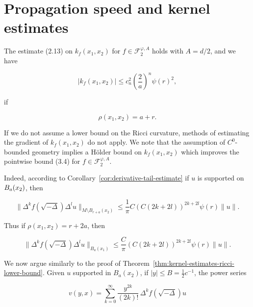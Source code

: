 \chapter{Propagation speed and kernel estimates}

The estimate (2.13) on $k_f(x_1,x_2)$ for $f\in \mathscr{F}_2^{\varphi,A}$ holds with $A=d/2$, and we have

\begin{equation}\tag{3.4}
|k_f(x_1,x_2)|\le c_n^2\left(\frac{2}{a}\right)^n \psi(r)^2,
\end{equation}

if

\begin{equation}\tag{3.5}
\rho(x_1,x_2)=a+r.
\end{equation}

If we do not assume a lower bound on the Ricci curvature, methods of estimating the gradient of $k_f(x_1,x_2)$ do not apply. We note that the assumption of $C^0$-bounded geometry implies a H\"older bound on $k_f(x_1,x_2)$ which improves the pointwise bound (3.4) for $f\in \mathscr{F}_2^{\varphi,A}$.

Indeed, according to Corollary~\ref{cor:derivative-tail-estimate} if $u$ is supported on $B_a(x_2)$, then

\begin{equation}\tag{3.6}
\bigl\|\Delta^k f(\sqrt{-\Delta}) \Delta^l u\bigr\|_{M\setminus B_{r+a}(x_2)}
\le \frac{1}{\pi} C(C(2k+2l))^{2k+2l}\psi(r)\|u\|.
\end{equation}

Thus if $\rho(x_1,x_2)=r+2a$, then

\begin{equation}\tag{3.7}
\bigl\|\Delta^k f(\sqrt{-\Delta}) \Delta^l u\bigr\|_{B_a(x_1)}
\le \frac{C}{\pi}(C(2k+2l))^{2k+2l}\psi(r)\|u\|.
\end{equation}

We now argue similarly to the proof of Theorem~\ref{thm:kernel-estimates-ricci-lower-bound}. Given $u$ supported in $B_a(x_2)$, if $|y|\le B=\tfrac12 c^{-1}$, the power series

\begin{equation}\tag{3.8}
v(y,x)=\sum_{k=0}^{\infty}\frac{y^{2k}}{(2k)!}\,\Delta^k f(\sqrt{-\Delta})u
\end{equation}

